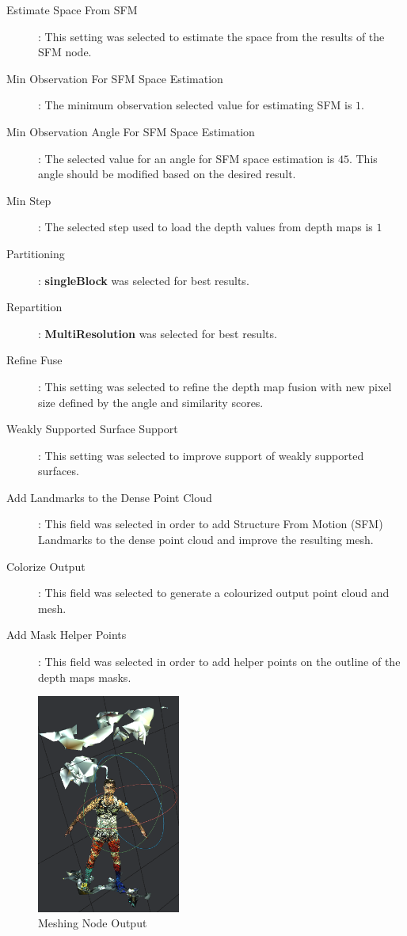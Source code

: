 \documentclass[12pt]{report}
\begin{document}
\begin{description}
  \item[Estimate Space From SFM]: This setting was selected to estimate the space from the results of the SFM node.
  \item[Min Observation For SFM Space Estimation]: The minimum observation selected value for estimating SFM is $1$.
  \item[Min Observation Angle For SFM Space Estimation]: The selected value for an angle for SFM space estimation is $45$. This angle should be modified based on the desired result.
  \item[Min Step]: The selected step used to load the depth values  from depth maps is $1$
  \item[Partitioning]: \textbf{singleBlock} was selected for best results.
  \item[Repartition] : \textbf{MultiResolution} was selected for best results.
  \item[Refine Fuse]: This setting was selected to refine the depth map fusion  with new pixel size defined by the angle and similarity scores.
  \item[Weakly Supported Surface Support]: This setting was selected  to improve support of weakly supported surfaces.
  \item[Add Landmarks to the Dense Point Cloud]: This field was selected in order to add Structure From Motion (SFM) Landmarks to the dense point cloud and improve the resulting mesh.
  \item[Colorize Output]: This field was selected to generate a colourized output point cloud and mesh.
  \item[Add Mask Helper Points]: This field was selected in order to add helper points on the outline of the depth maps masks.
\end{description}

\begin{figure}[H]%
  \centering
 \includegraphics[width=0.42\textwidth]{meshoing.png}
\caption{Meshing Node Output}
\label{fig:meshrom_mesh} 
\end{figure}
\end{document}
